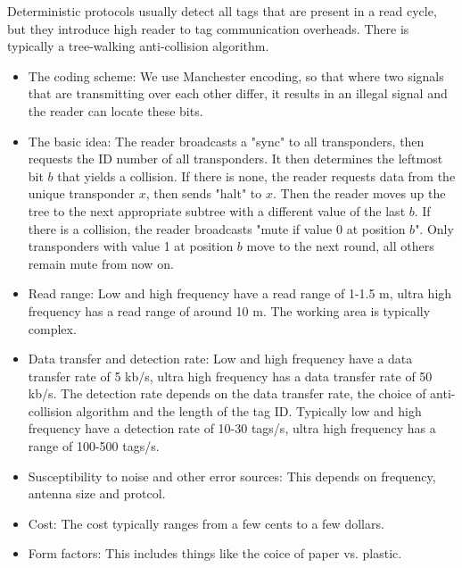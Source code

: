 
\begin{mytitle} Deterministic protocols usually detect all tags that are present in a read cycle, but they introduce high reader to tag communication overheads. There is typically a tree-walking anti-collision algorithm.
    \begin{mysubtitle} \hfill
    \begin{itemize}
        \item The coding scheme: We use Manchester encoding, so that where two signals that are transmitting over each other differ, it results in an illegal signal and the reader can locate these bits.
        \item The basic idea: The reader broadcasts a "sync" to all transponders, then requests the ID number of all transponders. It then determines the leftmost bit $b$ that yields a collision. If there is none, the reader requests data from the unique transponder $x$, then sends "halt" to $x$. Then the reader moves up the tree to the next appropriate subtree with a different value of the last $b$. If there is a collision, the reader broadcasts "mute if value 0 at position $b$". Only transponders with value 1 at position $b$ move to the next round, all others remain mute from now on.
    \end{itemize}
    \end{mysubtitle}
\end{mytitle}
\begin{mytitle} \hfill
\begin{itemize}
    \item Read range: Low and high frequency have a read range of 1-1.5 m, ultra high frequency has a read range of around 10 m. The working area is typically complex.
    \item Data transfer and detection rate: Low and high frequency have a data transfer rate of 5 kb/s, ultra high frequency has a data transfer rate of 50 kb/s. The detection rate depends on the data transfer rate, the choice of anti-collision algorithm and the length of the tag ID. Typically low and high frequency have a detection rate of 10-30 tags/s, ultra high frequency has a range of 100-500 tags/s.
    \item Susceptibility to noise and other error sources: This depends on frequency, antenna size and protcol.
    \item Cost: The cost typically ranges from a few cents to a few dollars.
    \item Form factors: This includes things like the coice of paper vs. plastic.
\end{itemize}
\end{mytitle}

